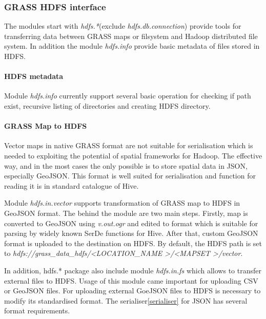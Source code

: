 \documentclass[a4paper,12pt,oneside]{report}
\begin{document}
\subsubsection{GRASS HDFS interface}
The modules start with \textit{hdfs.*}(exclude \textit{hdfs.db.connection}) provide tools for transferring data between GRASS maps or filsystem and Hadoop distributed file system. In addition the module \textit{hdfs.info} provide basic metadata of files stored in HDFS.

\paragraph{HDFS metadata} Module \textit{hdfs.info} currently support several basic operation for checking if path exist, recursive listing of directories and creating HDFS directory.


\paragraph{GRASS Map to HDFS} Vector maps in native GRASS format are not suitable for serialisation which is needed to exploiting the potential of spatial frameworks for Hadoop. The effective way, and in the most cases the only possible is to store spatial data in JSON, especially GeoJSON. This format is well suited for serialisation and function for reading it is in standard catalogue of Hive. 

Module \textit{hdfs.in.vector} supports transformation of GRASS map to HDFS in GeoJSON format. The behind the module are two main steps. Firstly, map is converted to GeoJSON using \textit{v.out.ogr} and edited to format which is suitable for parsing by widely known SerDe functions for Hive. After that, custom GeoJSON format is uploaded to the  destination on HDFS. By default, the HDFS path is set to \textit{hdfs://grass\_data\_hdfs/\textless LOCATION\_NAME \textgreater/\textless MAPSET \textgreater /vector}.

In addition, hdfs.* package also include module \textit{hdfs.in.fs} which allows to transfer external files to HDFS. Usage of this module came important for uploading CSV  or GeoJSON files. For uploading external GoeJSON files to HDFS is necessary to modify its standardised format. The serialiser\ref{serialiser}  for JSON has several format requirements. %
\end{document}
